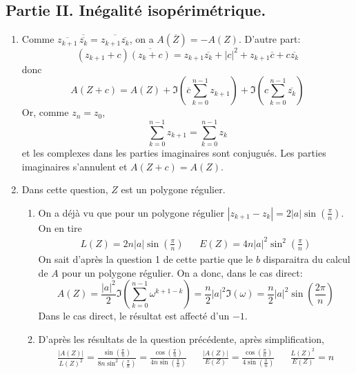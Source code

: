 \subsection*{Partie II. Inégalité isopérimétrique.}
\begin{enumerate}
 \item Comme $\overline{z_{k+1}}\,\overline{\overline{z_k}} = \overline{z_{k+1}\overline{z_k}}$, on a $A(\overline{Z})=-A(Z)$.\newline
D'autre part:
\begin{displaymath}
(z_{k+1}+c)\overline{(z_k+c)}=
z_{k+1}\overline{z_k} + |c|^2 + z_{k+1}\overline{c} + c \overline{z_k} 
\end{displaymath}
donc
\begin{displaymath}
 A(Z+c)= A(Z) 
+ \Im\left(\overline{c}\sum_{k=0}^{n-1}z_{k+1}\right)
+ \Im\left(c\sum_{k=0}^{n-1}\overline{z_{k}}\right) 
\end{displaymath}
Or, comme $z_n=z_0$,
\begin{displaymath}
 \sum_{k=0}^{n-1}z_{k+1} = \sum_{k=0}^{n-1}z_{k}
\end{displaymath}
et les complexes dans les parties imaginaires sont conjugués. Les parties imaginaires s'annulent et $A(Z+c) = A(Z)$.
 \item Dans cette question, $Z$ est un polygone régulier.
\begin{enumerate}
 \item On a déjà vu que pour un polygone régulier $|z_{k+1}-z_k|= 2|a|\sin\left( \frac{\pi}{n}\right)$. On en tire 
\begin{align*}
 L(Z) = 2 n|a|\sin\left( \frac{\pi}{n}\right) & &
 E(Z) = 4 n|a|^2\sin^2\left( \frac{\pi}{n}\right)
\end{align*}
On sait d'après la question 1 de cette partie que le $b$ disparaitra du calcul de $A$ pour un polygone régulier. On a donc, dans le cas direct:
\begin{displaymath}
 A(Z) = 
\frac{|a|^2}{2}\Im\left( \sum_{k=0}^{n-1}\omega^{k+1 - k}\right)
= \frac{n}{2}|a|^2\Im(\omega)
= \frac{n}{2}|a|^2\sin\left( \frac{2\pi}{n}\right) 
\end{displaymath}
Dans le cas direct, le résultat est affecté d'un $-1$. 
 \item D'après les résultats de la question précédente, après simplification,
\begin{align*}
 \frac{|A(Z)|}{L(Z)^2}
= \frac{\sin\left(\frac{\pi}{n} \right) }{8n\sin^2\left(\frac{\pi}{n} \right)}
= \frac{ \cos\left(\frac{\pi}{n} \right)}{4n\sin\left(\frac{\pi}{n} \right)}
 & &
\frac{|A(Z)|}{E(Z)} = \frac{ \cos\left(\frac{\pi}{n} \right)}{4\sin\left(\frac{\pi}{n} \right)}
 & &
\frac{L(Z)^2}{E(Z)} = n
\end{align*}
\end{enumerate}


\end{enumerate}
